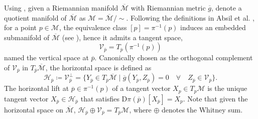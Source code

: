 \begin{definition}\label{def:horizontal_vertical_space}
    Using , given a Riemannian manifold $\overline{\mathcal{M}}$ with Riemannian metric $\overline{g}$, denote a quotient manifold of $\overline{\mathcal{M}}$ as $\mathcal{M}=\overline{\mathcal{M}}/\sim$. Following the definitions in Absil et al. \cite[p.~43]{AbsilMahonySepulchre2008}, for a point $p\in \mathcal{M}$, the equivalence class $[p]=\pi^{-1}(p)$ induces an embedded submanifold of $\overline{\mathcal{M}}$ (see ), hence it admits a tangent space,
    \begin{equation*}
        \mathcal{V}_{\overline{p}}=T_{\overline{p}}(\pi^{-1}(p))
    \end{equation*}
    named the \textup{vertical space} at $\overline{p}$. Canonically chosen as the orthogonal complement of $\mathcal{V}_{\overline{p}}$ in $T_{\overline{p}}\overline{\mathcal{M}}$, the \textup{horizontal space} \cite[p.~48]{AbsilMahonySepulchre2008} is defined as %
    \begin{equation*}
        \mathcal{H}_{\overline{p}}\coloneqq \mathcal{V}_{\overline{p}}^\perp=\{Y_{\overline{p}}\in T_{\overline{p}}\overline{\mathcal{M}} \;|\; \overline{g}(Y_{\overline{p}},Z_{\overline{p}})=0\quad\forall\quad Z_{\overline{p}}\in \mathcal{V}_{\overline{p}} \}.
    \end{equation*}
    The \textup{horizontal lift} at $\overline{p}\in\pi^{-1}(p)$ of a tangent vector $X_{p}\in T_{p}\mathcal{M}$ is the unique tangent vector $X_{\overline{p}}\in \mathcal{H}_{\overline{p}}$ that satisfies $\mathrm{D}\pi(\overline{p})[{X}_{\overline{p}}]=X_p$. Note that given the horizontal space on $\overline{\mathcal{M}}$, $\mathcal{H}_{\overline{p}}\oplus \mathcal{V}_{\overline{p}}=T_{\overline{p}}\mathcal{M}$, where $\oplus$ denotes the Whitney sum. 
\end{definition}

